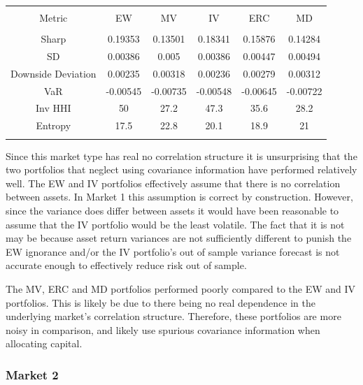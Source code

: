\documentclass[11pt,preprint, authoryear]{elsarticle}
\let\origtable\table
\let\endorigtable\endtable
\renewenvironment{table}[1][2] {
    \expandafter\origtable\expandafter[H]
} {
    \endorigtable
}
\numberwithin{equation}{section}
\numberwithin{figure}{section}
\numberwithin{table}{section}
\begin{document}
\begin{table}[!htbp] \centering 
  \caption{Market 1 - Portfolio Risk Metrics} 
  \label{rm1} 
\begin{tabular}{@{\extracolsep{5pt}} cccccc} 
\\[-1.8ex]\hline 
\hline \\[-1.8ex] 
Metric & EW & MV & IV & ERC & MD \\ 
\hline \\[-1.8ex] 
Sharp & 0.19353 & 0.13501 & 0.18341 & 0.15876 & 0.14284 \\ 
SD & 0.00386 & 0.005 & 0.00386 & 0.00447 & 0.00494 \\ 
Downside Deviation & 0.00235 & 0.00318 & 0.00236 & 0.00279 & 0.00312 \\ 
VaR & -0.00545 & -0.00735 & -0.00548 & -0.00645 & -0.00722 \\ 
Inv HHI & 50 & 27.2 & 47.3 & 35.6 & 28.2 \\ 
Entropy & 17.5 & 22.8 & 20.1 & 18.9 & 21 \\ 
\hline \\[-1.8ex] 
\end{tabular} 
\end{table}

Since this market type has real no correlation structure it is
unsurprising that the two portfolios that neglect using covariance
information have performed relatively well. The EW and IV portfolios
effectively assume that there is no correlation between assets. In
Market 1 this assumption is correct by construction. However, since the
variance does differ between assets it would have been reasonable to
assume that the IV portfolio would be the least volatile. The fact that
it is not may be because asset return variances are not sufficiently
different to punish the EW ignorance and/or the IV portfolio's out of
sample variance forecast is not accurate enough to effectively reduce
risk out of sample.

The MV, ERC and MD portfolios performed poorly compared to the EW and IV
portfolios. This is likely be due to there being no real dependence in
the underlying market's correlation structure. Therefore, these
portfolios are more noisy in comparison, and likely use spurious
covariance information when allocating capital.

\hypertarget{market-2}{%
\subsubsection{Market 2}\label{market-2}}
\end{document}
